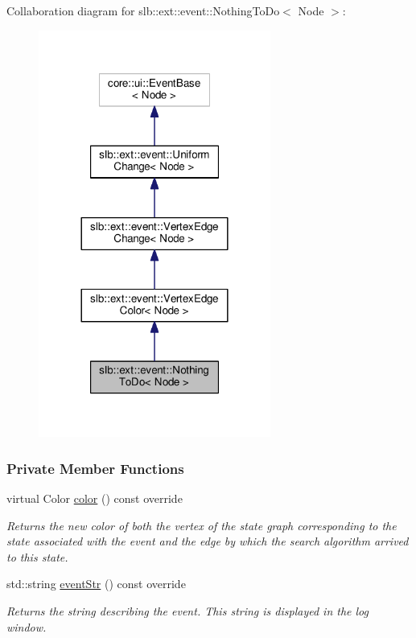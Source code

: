 Collaboration diagram for slb\+:\+:ext\+:\+:event\+:\+:Nothing\+To\+Do$<$ Node $>$\+:\nopagebreak
\begin{figure}[H]
\begin{center}
\leavevmode
\includegraphics[width=216pt]{structslb_1_1ext_1_1event_1_1NothingToDo__coll__graph}
\end{center}
\end{figure}
\subsubsection*{Private Member Functions}
\begin{DoxyCompactItemize}
\item 
virtual Color \hyperlink{structslb_1_1ext_1_1event_1_1NothingToDo_af5ce8c541cfb24f4d7619d09e32290fd}{color} () const override
\begin{DoxyCompactList}\small\item\em Returns the new color of both the vertex of the state graph corresponding to the state associated with the event and the edge by which the search algorithm arrived to this state. \end{DoxyCompactList}\item 
std\+::string \hyperlink{structslb_1_1ext_1_1event_1_1NothingToDo_a524c4806908548a5e77e17f9457329cb}{event\+Str} () const override
\begin{DoxyCompactList}\small\item\em Returns the string describing the event. This string is displayed in the log window. \end{DoxyCompactList}\end{DoxyCompactItemize}
